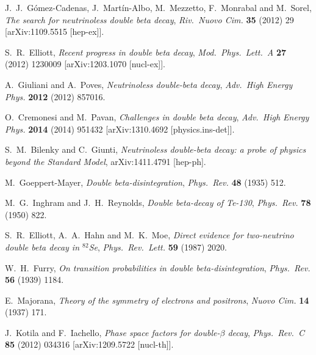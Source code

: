 \documentclass{PoS}
\begin{document}
\begin{thebibliography}{99}

   J.~J.~G\'omez-Cadenas, J.~Mart\'in-Albo, M.~Mezzetto, F.~Monrabal and M.~Sorel,
   \emph{The search for neutrinoless double beta decay},
   \emph{Riv.\ Nuovo Cim.} {\bf 35} (2012) 29
   [arXiv:1109.5515 [hep-ex]].

   S.~R.~Elliott,
   \emph{Recent progress in double beta decay},
   \emph{Mod.\ Phys.\ Lett.\ A} {\bf 27} (2012) 1230009
   [arXiv:1203.1070 [nucl-ex]].

   A.~Giuliani and A.~Poves,
   \emph{Neutrinoless double-beta decay},
   \emph{Adv.\ High Energy Phys.} {\bf 2012} (2012) 857016.

   O.~Cremonesi and M.~Pavan,
   \emph{Challenges in double beta decay},
   \emph{Adv.\ High Energy Phys.} {\bf 2014} (2014) 951432 
   [arXiv:1310.4692 [physics.ins-det]].

   S.~M.~Bilenky and C.~Giunti,
   \emph{Neutrinoless double-beta decay: a probe of physics beyond the Standard Model},
   arXiv:1411.4791 [hep-ph].

   M.~Goeppert-Mayer,
   \emph{Double beta-disintegration},
   \emph{Phys.\ Rev.} {\bf 48} (1935) 512.

   M.~G.~Inghram and J.~H.~Reynolds,
   \emph{Double beta-decay of Te-130},
   \emph{Phys.\ Rev.} {\bf 78} (1950) 822.

   S.~R.~Elliott, A.~A.~Hahn and M.~K.~Moe,
   \emph{Direct evidence for two-neutrino double beta decay in $^{82}$Se},
   \emph{Phys.\ Rev.\ Lett.} {\bf 59} (1987) 2020.

   W.~H.~Furry,
   \emph{On transition probabilities in double beta-disintegration},
   \emph{Phys.\ Rev.} {\bf 56} (1939) 1184.

   E.~Majorana,
   \emph{Theory of the symmetry of electrons and positrons},
   \emph{Nuovo Cim.} {\bf 14} (1937) 171.

   J.~Kotila and F.~Iachello,
   \emph{Phase space factors for double-$\beta$ decay},
   \emph{Phys.\ Rev.\ C} {\bf 85} (2012) 034316
   [arXiv:1209.5722 [nucl-th]].


\end{thebibliography}
\end{document}
